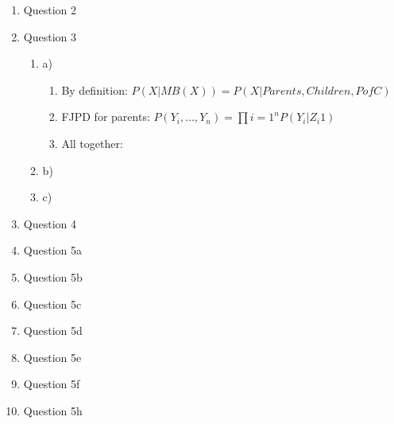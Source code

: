 \documentclass[11pt]{article}
\begin{document}
\begin{enumerate}
\begin{enumerate}
\end{enumerate}

\item Question 2

\item Question 3
\begin{enumerate}
\item a) 
\begin{enumerate}
\item By definition: $P(X|MB(X)) = P(X|Parents,Children,PofC) $
\item FJPD for parents: $P(Y_i, ..., Y_n) = \prod{i = 1}^{n} P(Y_i | Z_{i}1)$ 
\item All together: 
\end{enumerate}
\item b)
\item c)
\end{enumerate}

\item Question 4

\item Question 5a

\item Question 5b

\item Question 5c

\item Question 5d

\item Question 5e

\item Question 5f

\item Question 5h

\end{enumerate}
\end{document}

